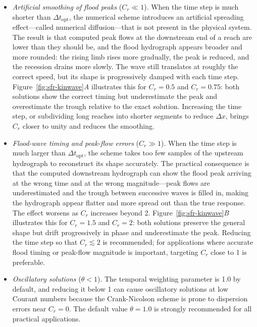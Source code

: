 \begin{itemize}

	\item \textit{Artificial smoothing of flood peaks} ($C_r \ll 1$). When the time step is much shorter than $\Delta t_\mathrm{opt}$, the numerical scheme introduces an artificial spreading effect---called numerical diffusion---that is not present in the physical system. The result is that computed peak flows at the downstream end of a reach are lower than they should be, and the flood hydrograph appears broader and more rounded: the rising limb rises more gradually, the peak is reduced, and the recession drains more slowly. The wave still translates at roughly the correct speed, but its shape is progressively damped with each time step. Figure~\ref{fig:sfr-kinwave}\textit{A} illustrates this for $C_r = 0.5$ and $C_r = 0.75$: both solutions show the correct timing but underestimate the peak and overestimate the trough relative to the exact solution. Increasing the time step, or subdividing long reaches into shorter segments to reduce $\Delta x$, brings $C_r$ closer to unity and reduces the smoothing.

	\item \textit{Flood-wave timing and peak-flow errors} ($C_r \gg 1$). When the time step is much larger than $\Delta t_\mathrm{opt}$, the scheme takes too few samples of the upstream hydrograph to reconstruct its shape accurately. The practical consequence is that the computed downstream hydrograph can show the flood peak arriving at the wrong time and at the wrong magnitude---peak flows are underestimated and the trough between successive waves is filled in, making the hydrograph appear flatter and more spread out than the true response. The effect worsens as $C_r$ increases beyond 2. Figure~\ref{fig:sfr-kinwave}\textit{B} illustrates this for $C_r = 1.5$ and $C_r = 2$: both solutions preserve the general shape but drift progressively in phase and underestimate the peak. Reducing the time step so that $C_r \lesssim 2$ is recommended; for applications where accurate flood timing or peak-flow magnitude is important, targeting $C_r$ close to 1 is preferable.

	\item \textit{Oscillatory solutions} ($\theta < 1$). The temporal weighting parameter is 1.0 by default, and reducing it below 1 can cause oscillatory solutions at low Courant numbers because the Crank-Nicolson scheme is prone to dispersion errors near $C_r = 0$. The default value $\theta = 1.0$ is strongly recommended for all practical applications.


\end{itemize}
